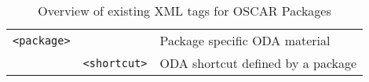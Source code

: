 \begin{table}[htbp]
\begin{center}
\begin{tabular}{|l|l|l|}
  \verb(<package>( &    & Package specific ODA material            \\\cline{2-3}
     & \verb(<shortcut>(& ODA shortcut defined by a package            \\\hline

  \end{tabular}
  \caption{Overview of existing XML tags for OSCAR Packages} 
  \label{tab:pkg-xml-tags}
  \end{center}  
\end{table}
